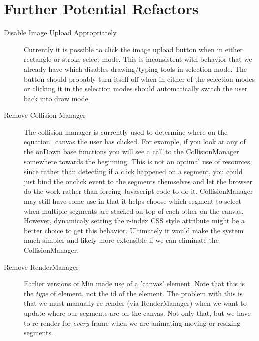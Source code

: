 \documentclass[letterpaper]{article}
\begin{document}
\section*{Further Potential Refactors}

\begin{description}
    \item[Disable Image Upload Appropriately] Currently it is possible to click the image
        upload button when in either rectangle or stroke select mode. This is
        inconsistent with behavior that we already have which disables
        drawing/typing tools in selection mode. The button should probably turn
        itself off when in either of the selection modes or clicking it in the
        selection modes should automatically switch the user back into draw
        mode.
    \item[Remove Collision Manager] The collision manager is currently used to
        determine where on the equation\_canvas the user has clicked. For
        example, if you look at any of the onDown base functions you will see a
        call to the CollisionManager somewhere towards the beginning. This is
        not an optimal use of resources, since rather than detecting if a
        click happened on a segment, you could just bind the onclick event to
        the segments themselves and let the browser do the work rather than
        forcing Javascript code to do it. CollisionManager may still have some
        use in that it helps choose which segment to select when multiple
        segments are stacked on top of each other on the canvas. However,
        dynamicaly setting the z-index CSS style attribute might be a better
        choice to get this behavior. Ultimately it would make the system much
        simpler and likely more extensible if we can eliminate the
        CollisionManager.
    \item[Remove RenderManager] Earlier versions of Min made use of a 'canvas'
        element. Note that this is the \emph{type} of element, not the id of the
        element. The problem with this is that we must manually re-render (via
        RenderManager) when we want to update where our segments are on the
        canvas. Not only that, but we have to re-render for \emph{every} frame
        when we are animating moving or resizing segments. 
        

\end{description}
\end{document}
